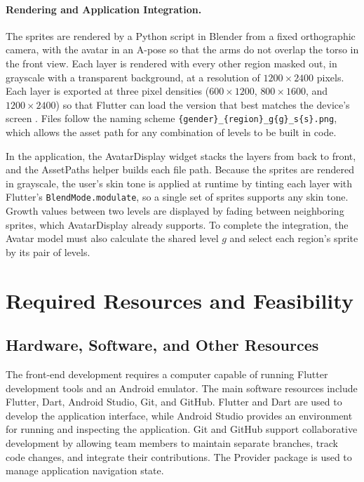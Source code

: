 \documentclass[11pt]{article}
\begin{document}
\paragraph{Rendering and Application Integration.}
The sprites are rendered by a Python script in Blender from a fixed orthographic camera, with the avatar in an A-pose so that the arms do not overlap the torso in the front view. Each layer is rendered with every other region masked out, in grayscale with a transparent background, at a resolution of $1200 \times 2400$ pixels. Each layer is exported at three pixel densities ($600 \times 1200$, $800 \times 1600$, and $1200 \times 2400$) so that Flutter can load the version that best matches the device's screen \cite{flutterassets}. Files follow the naming scheme \texttt{\{gender\}\_\{region\}\_g\{g\}\_s\{s\}.png}, which allows the asset path for any combination of levels to be built in code.

In the application, the AvatarDisplay widget stacks the layers from back to front, and the AssetPaths helper builds each file path. Because the sprites are rendered in grayscale, the user's skin tone is applied at runtime by tinting each layer with Flutter's \texttt{BlendMode.modulate}, so a single set of sprites supports any skin tone. Growth values between two levels are displayed by fading between neighboring sprites, which AvatarDisplay already supports. To complete the integration, the Avatar model must also calculate the shared level $g$ and select each region's sprite by its pair of levels.

\section{Required Resources and Feasibility}

\subsection{Hardware, Software, and Other Resources}
The front-end development requires a computer capable of running Flutter development tools and an Android emulator. The main software resources include Flutter, Dart, Android Studio, Git, and GitHub.
Flutter and Dart are used to develop the application interface, while Android Studio provides an environment for running and inspecting the application. Git and GitHub support collaborative development by allowing team members to maintain separate branches, track code changes, and integrate their contributions. The Provider package is used to manage application navigation state.
\end{document}

